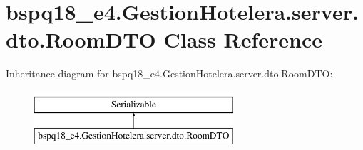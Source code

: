 \hypertarget{classbspq18__e4_1_1_gestion_hotelera_1_1server_1_1dto_1_1_room_d_t_o}{}\section{bspq18\+\_\+e4.\+Gestion\+Hotelera.\+server.\+dto.\+Room\+D\+TO Class Reference}
\label{classbspq18__e4_1_1_gestion_hotelera_1_1server_1_1dto_1_1_room_d_t_o}
Inheritance diagram for bspq18\+\_\+e4.\+Gestion\+Hotelera.\+server.\+dto.\+Room\+D\+TO\+:\begin{figure}[H]
\begin{center}
\leavevmode
\includegraphics[height=2.000000cm]{classbspq18__e4_1_1_gestion_hotelera_1_1server_1_1dto_1_1_room_d_t_o}
\end{center}
\end{figure}
